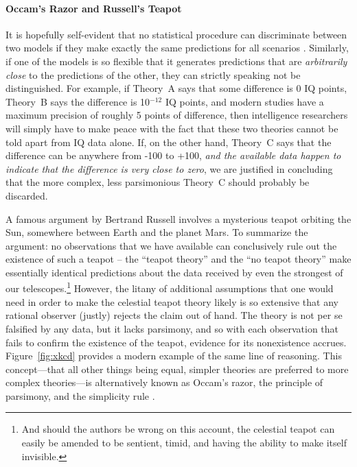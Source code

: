 \paragraph{Occam's Razor and Russell's Teapot}
It is hopefully self-evident that no statistical procedure can discriminate between two models if they make exactly the same predictions for all scenarios \cite{WrinchJeffreys1921}. Similarly, if one of the models is so flexible that it generates predictions that are \emph{arbitrarily close} to the predictions of the other, they can strictly speaking not be distinguished. For example, if Theory~A says that some difference is 0 IQ points, Theory~B says the difference is 10$^{-12}$ IQ points, and modern studies have a maximum precision of roughly 5 points of difference, then intelligence researchers will simply have to make peace with the fact that these two theories cannot be told apart from IQ data alone. If, on the other hand, Theory~C says that the difference can be anywhere from -100 to +100, \emph{and the available data happen to indicate that the difference is very close to zero}, we are justified in concluding that the more complex, less parsimonious Theory~C should probably be discarded.

A famous argument by Bertrand Russell \citeyear{russell1952there} involves a mysterious teapot orbiting the Sun, somewhere between Earth and the planet Mars. To summarize the argument: no observations that we have available can conclusively rule out the existence of such a teapot -- the ``teapot theory'' and the ``no teapot theory'' make essentially identical predictions about the data received by even the strongest of our telescopes.\footnote{And should the authors be wrong on this account, the celestial teapot can easily be amended to be sentient, timid, and having the ability to make itself invisible.} However, the litany of additional assumptions that one would need in order to make the celestial teapot theory likely is so extensive that any rational observer (justly) rejects the claim out of hand. The theory is not per se falsified by any data, but it lacks parsimony, and so with each observation that fails to confirm the existence of the teapot, evidence for its nonexistence accrues. Figure~\ref{fig:xkcd} provides a modern example of the same line of reasoning.  This concept---that all other things being equal, simpler theories are preferred to more complex theories---is alternatively known as Occam's razor, the principle of parsimony, and the simplicity rule \cite{Myung:Pitt:1997,VandekerckhoveEtAl2015MPT}.

